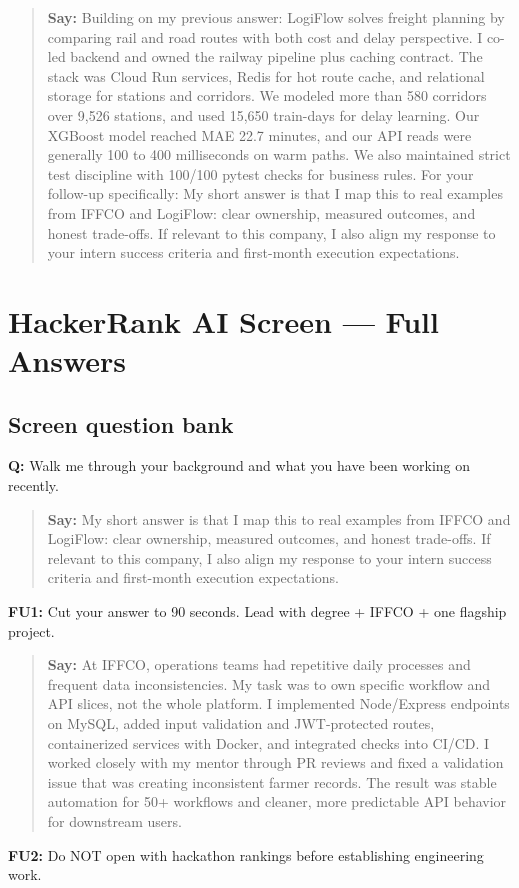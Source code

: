 \documentclass[9pt,a4paper]{article}
\begin{document}
\begin{quote}\small\textbf{Say:} Building on my previous answer: LogiFlow solves freight planning by comparing rail and road routes with both cost and delay perspective. I co-led backend and owned the railway pipeline plus caching contract. The stack was Cloud Run services, Redis for hot route cache, and relational storage for stations and corridors. We modeled more than 580 corridors over 9,526 stations, and used 15,650 train-days for delay learning. Our XGBoost model reached MAE 22.7 minutes, and our API reads were generally 100 to 400 milliseconds on warm paths. We also maintained strict test discipline with 100/100 pytest checks for business rules. For your follow-up specifically: My short answer is that I map this to real examples from IFFCO and LogiFlow: clear ownership, measured outcomes, and honest trade-offs. If relevant to this company, I also align my response to your intern success criteria and first-month execution expectations.\end{quote}
\vspace{2mm}
\newpage
\section{HackerRank AI Screen --- Full Answers}
\subsection{Screen question bank}
\textbf{Q:} Walk me through your background and what you have been working on recently.

\begin{quote}\small\textbf{Say:} My short answer is that I map this to real examples from IFFCO and LogiFlow: clear ownership, measured outcomes, and honest trade-offs. If relevant to this company, I also align my response to your intern success criteria and first-month execution expectations.\end{quote}
\vspace{2mm}
\textbf{FU1:} Cut your answer to 90 seconds. Lead with degree + IFFCO + one flagship project.

\begin{quote}\small\textbf{Say:} At IFFCO, operations teams had repetitive daily processes and frequent data inconsistencies. My task was to own specific workflow and API slices, not the whole platform. I implemented Node/Express endpoints on MySQL, added input validation and JWT-protected routes, containerized services with Docker, and integrated checks into CI/CD. I worked closely with my mentor through PR reviews and fixed a validation issue that was creating inconsistent farmer records. The result was stable automation for 50+ workflows and cleaner, more predictable API behavior for downstream users.\end{quote}
\vspace{2mm}
\textbf{FU2:} Do NOT open with hackathon rankings before establishing engineering work.
\end{document}
